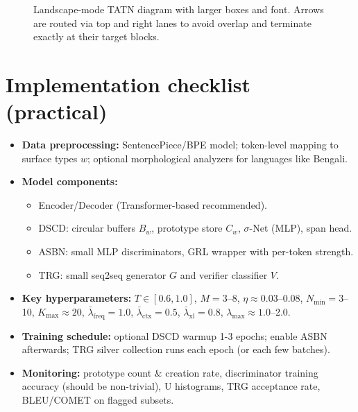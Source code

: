 \documentclass[11pt]{article}
\begin{document}
\begin{landscape}
\begin{figure}[htp]
{
}
\caption{Landscape-mode TATN diagram with larger boxes and font. Arrows are routed via top and right lanes to avoid overlap and terminate exactly at their target blocks.}
\label{fig:tatn-landscape}
\end{figure}
\end{landscape}




\section{Implementation checklist (practical)}
\begin{itemize}
  \item \textbf{Data preprocessing:} SentencePiece/BPE model; token-level mapping to surface types $w$; optional morphological analyzers for languages like Bengali.
  \item \textbf{Model components:}
    \begin{itemize}
      \item Encoder/Decoder (Transformer-based recommended).
      \item DSCD: circular buffers $B_w$, prototype store $C_w$, $\sigma$-Net (MLP), span head.
      \item ASBN: small MLP discriminators, GRL wrapper with per-token strength.
      \item TRG: small seq2seq generator $G$ and verifier classifier $V$.
    \end{itemize}
  \item \textbf{Key hyperparameters:} $T\in[0.6,1.0]$, $M=3$--8, $\eta\approx0.03$--0.08, $N_{\min}=3$--10, $K_{\max}\approx20$, $\bar\lambda_{\text{freq}}=1.0$, $\bar\lambda_{\text{ctx}}=0.5$, $\bar\lambda_{\text{xl}}=0.8$, $\lambda_{\max}\approx1.0$--2.0.
  \item \textbf{Training schedule:} optional DSCD warmup 1-3 epochs; enable ASBN afterwards; TRG silver collection runs each epoch (or each few batches).
  \item \textbf{Monitoring:} prototype count & creation rate, discriminator training accuracy (should be non-trivial), U histograms, TRG acceptance rate, BLEU/COMET on flagged subsets.
\end{itemize}
\end{document}

